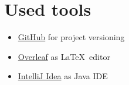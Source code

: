 \section{Used tools}
\begin{itemize}
    \item \href{https://github.com/}{GitHub} for project versioning
    \item \href{https://www.overleaf.com}{Overleaf} as \LaTeX\ editor
    \item \href{https://www.jetbrains.com/idea/}{IntelliJ Idea} as Java IDE
\end{itemize}